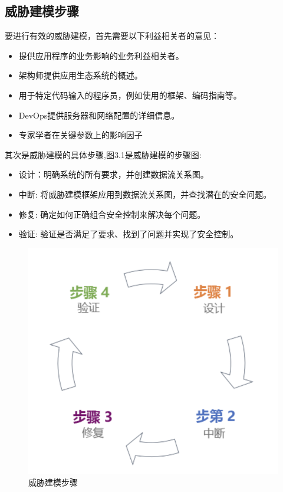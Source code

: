 \subsection{威胁建模步骤}
要进行有效的威胁建模，首先需要以下利益相关者的意见：
\begin{itemize}
    \item 提供应用程序的业务影响的业务利益相关者。
    \item 架构师提供应用生态系统的概述。
    \item 用于特定代码输入的程序员，例如使用的框架、编码指南等。
    \item DevOps提供服务器和网络配置的详细信息。
    \item 专家学者在关键参数上的影响因子
  \end{itemize}
  其次是威胁建模的具体步骤,图3.1是威胁建模的步骤图:
  \begin{itemize}
    \item 设计：明确系统的所有要求，并创建数据流关系图。
    \item 中断: 将威胁建模框架应用到数据流关系图，并查找潜在的安全问题。
    \item 修复: 确定如何正确组合安全控制来解决每个问题。
    \item 验证: 验证是否满足了要求、找到了问题并实现了安全控制。
  \end{itemize}
  \begin{figure}
    \centering
    \includegraphics[scale=0.6]{resources/img/i4.png}
    \caption{威胁建模步骤}
  \end{figure}

